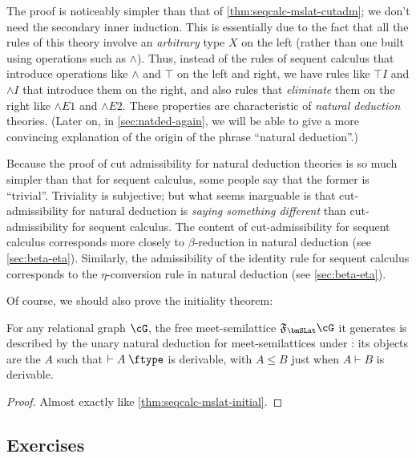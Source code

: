 \documentclass{book}
\let\types\vdash
\def\type{\;\ftype}
\newcommand{\F}[1]{\mathfrak{F}_{#1}}
\let\meet\wedge
\def\meetE{\mathord{\meet}E}
\def\meetI{\mathord{\meet}I}
\begin{document}
The proof is noticeably simpler than that of \cref{thm:seqcalc-mslat-cutadm}; we don't need the secondary inner induction.
This is essentially due to the fact that all the rules of this theory involve an \emph{arbitrary} type $X$ on the left (rather than one built using operations such as $\meet$).
Thus, instead of the rules of sequent calculus that introduce operations like $\meet$ and $\top$ on the left and right, we have rules like $\top I$ and $\meetI$ that introduce them on the right, and also rules that \emph{eliminate} them on the right like $\meetE1$ and $\meetE2$.
These properties are characteristic of \emph{natural deduction} theories.
(Later on, in \cref{sec:natded-again}, we will be able to give a more convincing explanation of the origin of the phrase ``natural deduction''.)

\begin{rmk}
  Because the proof of cut admissibility for natural deduction theories is so much simpler than that for sequent calculus, some people say that the former is ``trivial''.
  Triviality is subjective; but what seems inarguable is that cut-admissibility for natural deduction is \emph{saying something different} than cut-admissibility for sequent calculus.
  The content of cut-admissibility for sequent calculus corresponds more closely to $\beta$-reduction in natural deduction (see \cref{sec:beta-eta}).
  Similarly, the admissibility of the identity rule for sequent calculus corresponds to the $\eta$-conversion rule in natural deduction (see \cref{sec:beta-eta}).
\end{rmk}

Of course, we should also prove the initiality theorem:

\begin{thm}\label{thm:natded-mslat-initial}
  For any relational graph $\cG$, the free meet-semilattice $\F\bmSLat \cG$ it generates is described by the unary natural deduction for meet-semilattices under \cG: its objects are the $A$ such that $\types A\type$ is derivable, with $A\le B$ just when $A\types B$ is derivable.
\end{thm}
\begin{proof}
  Almost exactly like \cref{thm:seqcalc-mslat-initial}.
\end{proof}

\subsection*{Exercises}
\end{document}
